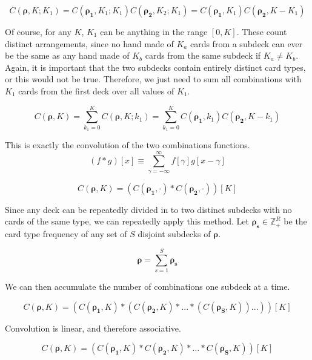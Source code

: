 \documentclass{article}
\begin{document}
\begin{equation}
    C(\bm{\rho}, K; K_1) = C(\bm{\rho_1}, K_1 ; K_1) C(\bm{\rho_2}, K_2; K_1)= C(\bm{\rho_1}, K_1) C(\bm{\rho_2}, K - K_1)
\end{equation}

Of course, for any $K$, $K_1$ can be anything in the range $[0, K]$. These count distinct arrangements, since no hand made of $K_a$ cards from a subdeck can ever be the same as any hand made of $K_b$ cards from the same subdeck if $K_a \ne K_b$. Again, it is important that the two subdecks contain entirely distinct card types, or this would not be true. Therefore, we just need to sum all combinations with $K_1$ cards from the first deck over all values of $K_1$.

\begin{equation}
    C(\bm{\rho}, K) = \sum_{k_1=0}^K C(\bm{\rho}, K; k_1) = \sum_{k_1=0}^K C(\bm{\rho_1}, k_1) C(\bm{\rho_2}, K - k_1)
\end{equation}

This is exactly the convolution of the two combinations functions. 
\begin{equation}
     (f * g)[x] \equiv \sum_{\gamma=-\infty}^{\infty} f[\gamma]g[x - \gamma]
\end{equation}

\begin{equation}
    C(\bm{\rho}, K) = (C(\bm{\rho_1}, \cdot) * C(\bm{\rho_2}, \cdot))[K]
\end{equation}

Since any deck can be repeatedly divided in to two distinct subdecks with no cards of the same type, we can repeatedly apply this method. Let $\bm{\rho_{s}} \in \mathbb{Z}_{+}^R$ be the card type frequency of any set of $S$ disjoint subdecks of $\bm{\rho}$.

\begin{equation}
    \bm{\rho} = \sum_{s = 1}^{S} \bm{\rho_{s}}
\end{equation}

We can then accumulate the number of combinations one subdeck at a time.

\begin{equation}
    C(\bm{\rho}, K) = (C(\bm{\rho_{1}}, K) * (C(\bm{\rho_{2}},K) * ... * (C(\bm{\rho_{S}}, K))...))[K]
\end{equation}

Convolution is linear, and therefore associative.

\begin{equation}
    C(\bm{\rho}, K) = (C(\bm{\rho_{1}}, K) * C(\bm{\rho_{2}},K) * ... * C(\bm{\rho_{S}}, K)) [K]
\end{equation}
\end{document}
